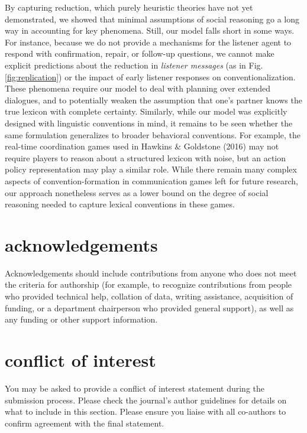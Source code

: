 \documentclass[alpha-refs]{wiley-article}
\begin{document}
By capturing reduction, which purely heuristic theories have not yet
demonstrated, we showed that minimal assumptions of social reasoning go
a long way in accounting for key phenomena. Still, our model falls short
in some ways. For instance, because we do not provide a mechanisms for
the listener agent to respond with confirmation, repair, or follow-up
questions, we cannot make explicit predictions about the reduction in
\emph{listener messages} (as in Fig. \ref{fig:replication}) or the
impact of early listener responses on conventionalization. These
phenomena require our model to deal with planning over extended
dialogues, and to potentially weaken the assumption that one's partner
knows the true lexicon with complete certainty. Similarly, while our
model was explicitly designed with linguistic conventions in mind, it
remains to be seen whether the same formulation generalizes to broader
behavioral conventions. For example, the real-time coordination games
used in Hawkins \& Goldstone (2016) may not require players to reason
about a structured lexicon with noise, but an action policy
representation may play a similar role. While there remain many complex
aspects of convention-formation in communication games left for future
research, our approach nonetheless serves as a lower bound on the degree
of social reasoning needed to capture lexical conventions in these
games.

\section*{acknowledgements}
Acknowledgements should include contributions from anyone who does not meet the criteria for authorship (for example, to recognize contributions from people who provided technical help, collation of data, writing assistance, acquisition of funding, or a department chairperson who provided general support), as well as any funding or other support information.

\section*{conflict of interest}
You may be asked to provide a conflict of interest statement during the submission process. Please check the journal's author guidelines for details on what to include in this section. Please ensure you liaise with all co-authors to confirm agreement with the final statement.

\printendnotes


\end{document}
